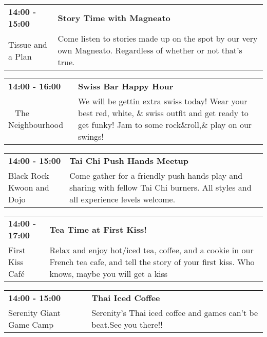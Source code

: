 \begin{tabular}{ p{1in} p{2.2in} }
    \textbf{14:00 - 15:00} & \textbf{Story Time with Magneato} \\
    Tissue and a Plan \newline  & Come listen to stories made up on the spot by our very own Magneato. Regardless of whether or not that's true. \\
    \hline 
\end{tabular}
    
\begin{tabular}{ p{1in} p{2.2in} }
    \textbf{14:00 - 16:00} & \textbf{Swiss Bar Happy Hour} \\
    ~ \newline The Neighbourhood & We will be gettin extra swiss today! Wear your best red, white, \& swiss outfit and get ready to get funky! Jam to some rock\&roll,\& play on our swings! \\
    \hline 
\end{tabular}
    
\begin{tabular}{ p{1in} p{2.2in} }
    \textbf{14:00 - 15:00} & \textbf{Tai Chi Push Hands Meetup} \\
    Black Rock Kwoon and Dojo \newline  & Come gather for a friendly push hands play and sharing with fellow Tai Chi burners. All styles and all experience levels welcome. \\
    \hline 
\end{tabular}
    
\begin{tabular}{ p{1in} p{2.2in} }
    \textbf{14:00 - 17:00} & \textbf{Tea Time at First Kiss!} \\
    First Kiss Caf\'e \newline  & Relax and enjoy hot/iced tea, coffee, and a cookie in our French tea cafe, and tell the story of your first kiss. Who knows, maybe you will get a kiss \\
    \hline 
\end{tabular}
    
\begin{tabular}{ p{1in} p{2.2in} }
    \textbf{14:00 - 15:00} & \textbf{Thai Iced Coffee} \\
    Serenity Giant Game Camp \newline  & Serenity's Thai iced coffee and games can't be beat.See you there!! \\
    \hline 
\end{tabular}
    
